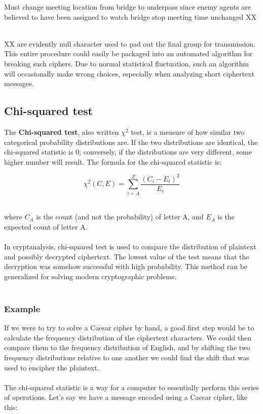 \documentclass[Lau,binding=0.6cm,oneside]{sapthesis}
\begin{document}
\begin{displayquote}{\small{\textsf{Must change meeting location from bridge to underpass since enemy agents are believed to have been assigned to watch bridge stop meeting time unchanged XX}}}
\end{displayquote}
\ \\
\textsf{XX} are evidently null character used to pad out the final group for transmission. This entire procedure could easily be packaged into an automated algorithm for breaking such ciphers. Due to normal statistical fluctuation, such an algorithm will occasionally make wrong choices, especially when analyzing short ciphertext messages.

\subsection{Chi-squared test}
The \textbf{Chi-squared test}, also written $\chi^{2}$ test, is a measure of how similar two categorical probability distributions are. If the two distributions are identical, the chi-squared statistic is 0; conversely, if the distributions are very different, some higher number will result. The formula for the chi-squared statistic is:

\begin{equation}
\chi^{2}(C, E) = \sum\limits_{i=A}^{Z} \frac{(C_i - E_i)^{2}}{E_i}
\end{equation}

\ \\
where $C_A$ is the count (and not the probability) of letter \textsf{A}, and $E_A$ is the expected count of letter \textsf{A}.\\\\
In cryptanalysis, chi-squared test is used to compare the distribution of plaintext and possibly decrypted ciphertext. The lowest value of the test means that the decryption was somehow successful with high probability. This method can be generalized for solving modern cryptographic problems.\\\\

\subsubsection{Example}
If we were to try to solve a Caesar cipher by hand, a good first step would be to calculate the frequency distribution of the ciphertext characters. We could then compare them to the frequency distribution of English, and by shifting the two frequency distributions relative to one another we could find the shift that was used to encipher the plaintext.\\\\
The chi-squared statistic is a way for a computer to essentially perform this series of operations. Let's say we have a message encoded using a Caesar cipher, like this:
\end{document}
